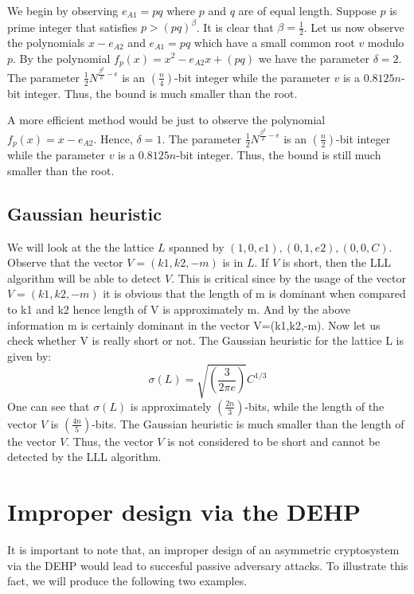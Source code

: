 \documentclass{llncs}
\begin{document}
\begin{case}
We begin by observing $e_{A1}=pq$ where $p$ and $q$ are of equal
length. Suppose $p$ is prime integer that satisfies
$p>(pq)^{\beta}$. It is clear that $\beta=\frac{1}{2}$. Let us now
observe the polynomials $x-e_{A2}$ and $e_{A1}=pq$ which have a
small common root $v$ modulo $p$. By the polynomial
$f_{p}(x)=x^{2}-e_{A2}x+(pq)$ we have the parameter $\delta=2$.
The parameter $\frac{1}{2} N^{\frac{\beta^{2}}{\delta} -
\epsilon}$ is an $(\frac{n}{4})$-bit integer while the parameter
$v$ is a $0.8125n$-bit integer. Thus, the bound is much smaller
than the root.
\end{case}

\begin{case}
A more efficient method would be just to observe the polynomial
$f_{p}(x)=x-e_{A2}$. Hence, $\delta=1$. The parameter $\frac{1}{2}
N^{\frac{\beta^{2}}{\delta} - \epsilon}$ is an $(\frac{n}{2})$-bit
integer while the parameter $v$ is a $0.8125n$-bit integer. Thus,
the bound is still much smaller than the root.
\end{case}

\subsection{Gaussian heuristic}
We will look at the the lattice $L$ spanned by $(1, 0,
e1),(0,1,e2),(0,0,C)$. Observe that the vector $V=(k1,k2,-m)$ is
in $L$. If $V$ is short, then the LLL algorithm will be able to
detect $V$. This is critical since by the usage of the vector
$V=(k1,k2,-m)$ it is obvious that the length of m is dominant when
compared to k1 and k2 hence length of V is approximately m. And by
the above information m is certainly dominant in the vector
V=(k1,k2,-m). Now let us check whether V is really short or not.
The Gaussian heuristic for the lattice L is given by:
\begin{equation}
\sigma (L)=\sqrt{(\frac{3}{2 \pi e})}   C^{1/3}
\end{equation}
One can see that $\sigma (L)$ is approximately $(\frac{2n}{3})$-bits,
while the length of the vector $V$ is $(\frac{4n}{5})$-bits. The
Gaussian heuristic is much smaller than the length of the vector $V$.
Thus, the vector $V$ is not considered to be short and cannot be detected
by the LLL algorithm.

\section{Improper design via the DEHP}
It is important to note that, an improper design of an asymmetric
cryptosystem via the DEHP would lead to succesful passive
adversary attacks. To illustrate this fact, we will produce the
following two examples.
\end{document}
